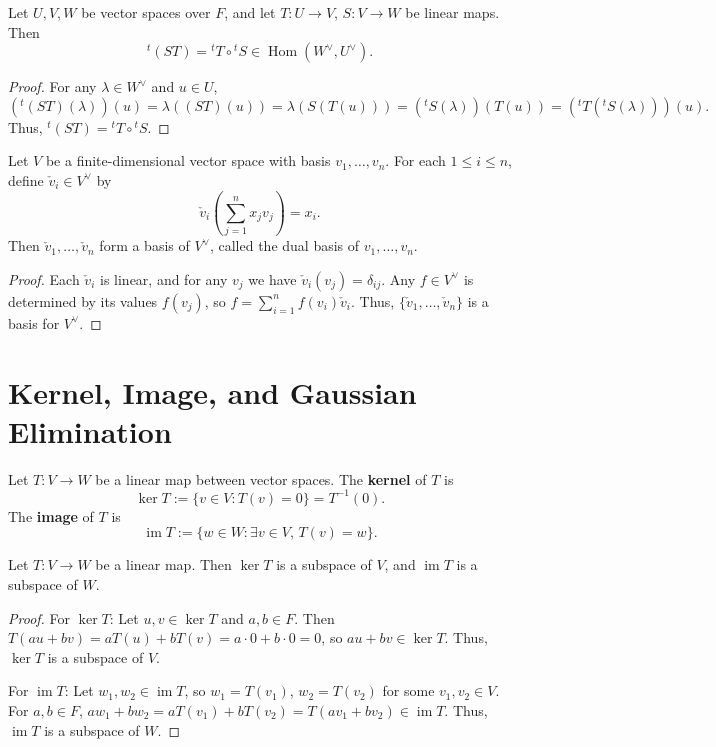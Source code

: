 \begin{proposition}
  Let $U, V, W$ be vector spaces over $F$, and let $T: U \to V$, $S: V \to W$ be linear maps. Then
  \[
    {}^t\!(S T) = {}^t\!T \circ {}^t\!S \in \operatorname{Hom}(W^\vee, U^\vee).
  \]
\end{proposition}

\begin{proof}
  For any $\lambda \in W^\vee$ and $u \in U$,
  \[
    ({}^t\!(S T)(\lambda))(u) = \lambda((S T)(u)) = \lambda(S(T(u))) = ({}^t\!S(\lambda))(T(u)) = ({}^t\!T({}^t\!S(\lambda)))(u).
  \]
  Thus, ${}^t\!(S T) = {}^t\!T \circ {}^t\!S$.
\end{proof}

\begin{proposition}
  Let $V$ be a finite-dimensional vector space with basis $v_1, \ldots, v_n$. For each $1 \leq i \leq n$, define $\check{v}_i \in V^\vee$ by
  \[
    \check{v}_i\left(\sum_{j=1}^n x_j v_j\right) = x_i.
  \]
  Then $\check{v}_1, \ldots, \check{v}_n$ form a basis of $V^\vee$, called the dual basis of $v_1, \ldots, v_n$.
\end{proposition}

\begin{proof}
  Each $\check{v}_i$ is linear, and for any $v_j$ we have $\check{v}_i(v_j) = \delta_{ij}$. Any $f \in V^\vee$ is determined by its values $f(v_j)$, so $f = \sum_{i=1}^n f(v_i)\check{v}_i$. Thus, $\{\check{v}_1, \ldots, \check{v}_n\}$ is a basis for $V^\vee$.
\end{proof}

\section{Kernel, Image, and Gaussian Elimination}

\begin{definition}
  Let $T: V \to W$ be a linear map between vector spaces. The \textbf{kernel} of $T$ is
  \[
    \ker T := \{ v \in V : T(v) = 0 \} = T^{-1}(0).
  \]
  The \textbf{image} of $T$ is
  \[
    \operatorname{im} T := \{ w \in W : \exists v \in V,\, T(v) = w \}.
  \]
\end{definition}

\begin{proposition}
  Let $T: V \to W$ be a linear map. Then $\ker T$ is a subspace of $V$, and $\operatorname{im} T$ is a subspace of $W$.
\end{proposition}

\begin{proof}
  For $\ker T$:
  Let $u, v \in \ker T$ and $a, b \in F$. Then $T(au + bv) = aT(u) + bT(v) = a \cdot 0 + b \cdot 0 = 0$, so $au + bv \in \ker T$. Thus, $\ker T$ is a subspace of $V$.

  For $\operatorname{im} T$:
  Let $w_1, w_2 \in \operatorname{im} T$, so $w_1 = T(v_1)$, $w_2 = T(v_2)$ for some $v_1, v_2 \in V$. For $a, b \in F$, $a w_1 + b w_2 = a T(v_1) + b T(v_2) = T(a v_1 + b v_2) \in \operatorname{im} T$. Thus, $\operatorname{im} T$ is a subspace of $W$.
\end{proof}

